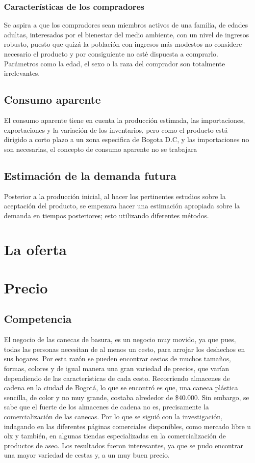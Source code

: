 \documentclass{report}
\begin{document}
    \subsection{Características de los compradores}
    Se aspira a que los compradores sean miembros activos de una familia, de edades adultas, interesados por el bienestar del medio ambiente, con un nivel de ingresos robusto, puesto que quizá la población con ingresos más modestos no considere necesario el producto y por consiguiente no esté dispuesta a comprarlo. Parámetros como la edad, el sexo o la raza del comprador son totalmente irrelevantes.

    \section{Consumo aparente}
    El consumo aparente tiene en cuenta la producción estimada, las importaciones, exportaciones y la variación de los inventarios, pero como el producto está dirigido a corto plazo a un zona especifica de Bogota D.C, y las importaciones no son necesarias, el concepto de consumo aparente no se trabajara

    \section{Estimación de la demanda futura}
    Posterior a la producción inicial, al hacer los pertinentes estudios sobre la aceptación del producto, se empezara hacer una estimación apropiada sobre la demanda en tiempos posteriores; esto utilizando diferentes métodos.

\chapter{La oferta}

\chapter{Precio}

    \section{Competencia}
    El negocio de las canecas de basura, es un negocio muy movido, ya que pues, todas las personas necesitan de al menos un cesto, para arrojar los deshechos en sus hogares. Por esta razón se pueden encontrar cestos de muchos tamaños, formas, colores y de igual manera una gran variedad de precios, que varían dependiendo de las características de cada cesto.
Recorriendo almacenes de cadena en la ciudad de Bogotá, lo que se encontró es que, una caneca plástica sencilla, de color y no muy grande, costaba alrededor de \$40.000. Sin embargo, se sabe que el fuerte de los almacenes de cadena no es, precisamente la comercialización de las canecas.
 Por lo que se siguió con la investigación, indagando en las diferentes páginas comerciales disponibles, como mercado libre u olx y también, en algunas tiendas especializadas en la comercialización de productos de aseo. Los resultados fueron interesantes, ya que se pudo encontrar una mayor variedad de cestas y, a un muy buen precio.
\end{document}
